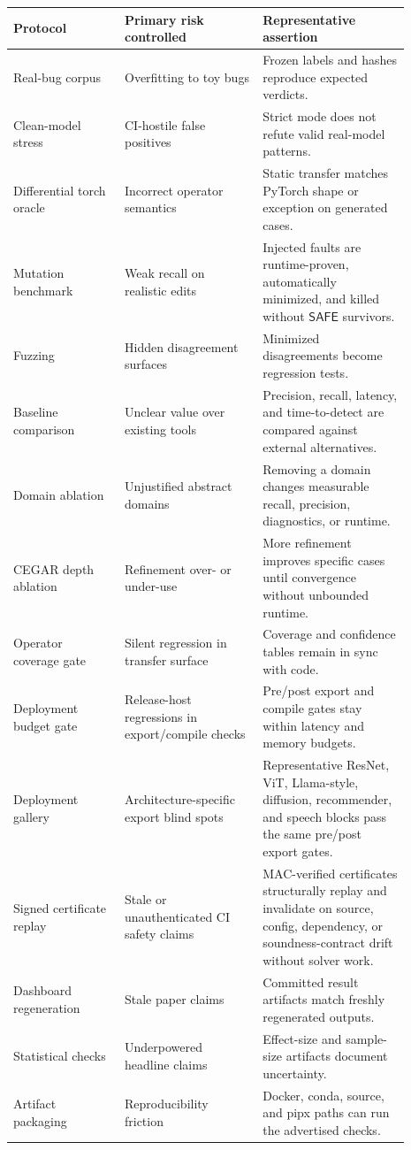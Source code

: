 \documentclass[11pt]{article}
\newcommand{\safe}{\ensuremath{\mathsf{SAFE}}}
\begin{document}
\begin{longtable}{|p{0.25\linewidth}|p{0.31\linewidth}|p{0.33\linewidth}|}
\hline
\textbf{Protocol} & \textbf{Primary risk controlled} & \textbf{Representative
assertion} \\
\hline
Real-bug corpus & Overfitting to toy bugs & Frozen labels and hashes reproduce
expected verdicts. \\
\hline
Clean-model stress & CI-hostile false positives & Strict mode does not refute
valid real-model patterns. \\
\hline
Differential torch oracle & Incorrect operator semantics & Static transfer
matches PyTorch shape or exception on generated cases. \\
\hline
Mutation benchmark & Weak recall on realistic edits & Injected faults are
runtime-proven, automatically minimized, and killed without \safe{} survivors. \\
\hline
Fuzzing & Hidden disagreement surfaces & Minimized disagreements become
regression tests. \\
\hline
Baseline comparison & Unclear value over existing tools & Precision, recall,
latency, and time-to-detect are compared against external alternatives. \\
\hline
Domain ablation & Unjustified abstract domains & Removing a domain changes
measurable recall, precision, diagnostics, or runtime. \\
\hline
CEGAR depth ablation & Refinement over- or under-use & More refinement improves
specific cases until convergence without unbounded runtime. \\
\hline
Operator coverage gate & Silent regression in transfer surface & Coverage and
confidence tables remain in sync with code. \\
\hline
Deployment budget gate & Release-host regressions in export/compile checks &
Pre/post export and compile gates stay within latency and memory budgets. \\
\hline
Deployment gallery & Architecture-specific export blind spots &
Representative ResNet, ViT, Llama-style, diffusion, recommender, and speech
blocks pass the same pre/post export gates. \\
\hline
Signed certificate replay & Stale or unauthenticated CI safety claims &
MAC-verified certificates structurally replay and invalidate on source, config,
dependency, or soundness-contract drift without solver work. \\
\hline
Dashboard regeneration & Stale paper claims & Committed result artifacts match
freshly regenerated outputs. \\
\hline
Statistical checks & Underpowered headline claims & Effect-size and sample-size
artifacts document uncertainty. \\
\hline
Artifact packaging & Reproducibility friction & Docker, conda, source, and
pipx paths can run the advertised checks. \\
\hline
\end{longtable}
\end{document}
